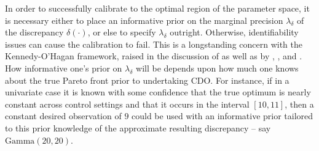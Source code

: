 \documentclass[12pt]{article}
\begin{document}


%
In order to successfully calibrate to the optimal region of the parameter space, it is necessary either to place an informative prior on the marginal precision $\lambda_\delta$ of the discrepancy $\delta(\cdot)$, or else to specify $\lambda_\delta$ outright. 
%
Otherwise, identifiability issues can cause the calibration to fail.
%
This is a longstanding concern with the Kennedy-O'Hagan framework, raised in the discussion of \cite{Kennedy2001} as well as by \cite{Bayarri2007}, \cite{Tuo2015}, and \cite{Plumlee2017}.
%
How informative one's prior on $\lambda_\delta$ will be depends upon how much one knows about the true Pareto front prior to undertaking CDO.
%
For instance, if in a univariate case it is known with some confidence that the true optimum is nearly constant across control settings and that it occurs in the interval $[10,11]$, then a constant desired observation of $9$ could be used with an informative prior tailored to this prior knowledge of the approximate resulting discrepancy -- say $\mathrm{Gamma}(20,20)$.
%
\end{document}
